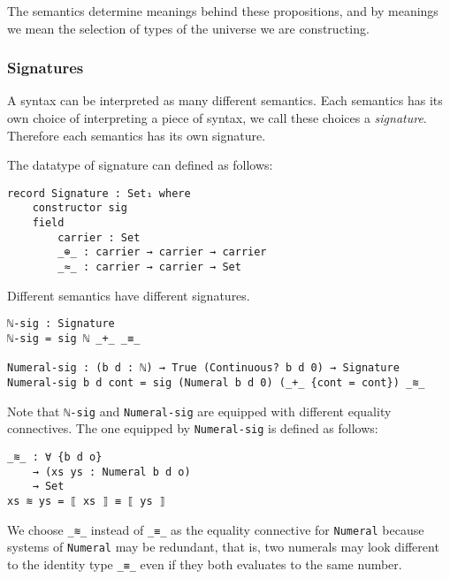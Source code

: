 \documentclass[\main/thesis.tex]{subfiles}
\begin{document}
The semantics determine meanings behind these propositions, and by meanings
we mean the selection of types of the universe we are constructing.

\subsubsection{Signatures}

A syntax can be interpreted as many different semantics.
Each semantics has its own choice of interpreting a piece of syntax,
we call these choices a \textit{signature}.
Therefore each semantics has its own signature.

The datatype of signature can defined as follows:

\begin{lstlisting}
record Signature : Set₁ where
    constructor sig
    field
        carrier : Set
        _⊕_ : carrier → carrier → carrier
        _≈_ : carrier → carrier → Set
\end{lstlisting}

Different semantics have different signatures.

\begin{lstlisting}
ℕ-sig : Signature
ℕ-sig = sig ℕ _+_ _≡_

Numeral-sig : (b d : ℕ) → True (Continuous? b d 0) → Signature
Numeral-sig b d cont = sig (Numeral b d 0) (_+_ {cont = cont}) _≋_
\end{lstlisting}

Note that \lstinline|ℕ-sig| and \lstinline|Numeral-sig| are equipped with
different equality connectives.
The one equipped by \lstinline|Numeral-sig| is defined as follows:

\begin{lstlisting}
_≋_ : ∀ {b d o}
    → (xs ys : Numeral b d o)
    → Set
xs ≋ ys = ⟦ xs ⟧ ≡ ⟦ ys ⟧
\end{lstlisting}





We choose \lstinline|_≋_| instead of \lstinline|_≡_| as the equality connective
for \lstinline|Numeral| because systems of \lstinline|Numeral| may be redundant,
that is, two numerals may look different to the identity
type \lstinline|_≡_| even if they both evaluates to the same number.
\end{document}
